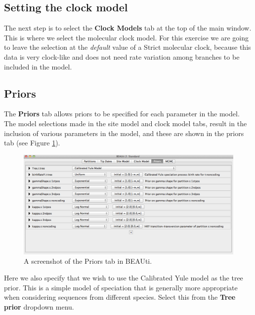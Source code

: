 \documentclass[11pt]{article}
\theoremstyle{plain}%
\theoremstyle{definition}
\theoremstyle{remark}
\begin{document}
\subsection{Setting the clock model}

The next step is to select the {\bf Clock Models} tab at the top of the
main window. This is where we select the molecular clock model. For this exercise we are going to leave the selection at the {\it default} value of a Strict molecular clock, because this data is very clock-like and does not need rate variation among branches to be included in the model.


\subsection{Priors }

The {\bf Priors} tab allows priors to be specified for each parameter in the
model. The model selections made in the site model and clock model tabs, result in the inclusion of various parameters
in the model, and these are shown in the priors tab (see Figure \ref{fig:BEAUti_Prior1}).

\begin{figure}
\includegraphics[width=\textwidth]{figures/BEAUti_Prior1}
\caption{A screenshot of the Priors tab in BEAUti. }
\label{fig:BEAUti_Prior1}
\end{figure}

Here we also specify that we wish to use the Calibrated Yule model \cite{Heled:2012fk}
as the tree prior. This is a simple model of speciation that
is generally more appropriate when considering sequences from different species. %
Select this from the {\bf Tree prior} dropdown menu.
\end{document}
